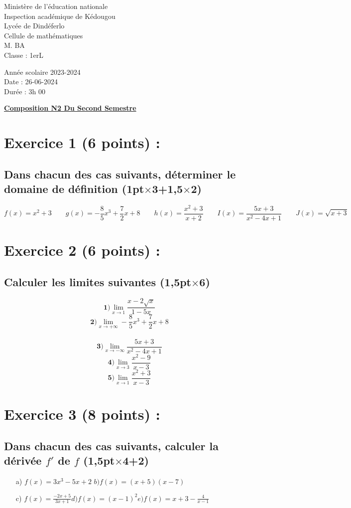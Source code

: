 \documentclass{article}
\begin{document}
\begin{minipage}{0.5\textwidth}
	Ministère de l'éducation nationale  \\
	Inspection académique de Kédougou   \\
	Lycée de Dindéferlo            \\
	Cellule de mathématiques            \\
	M. BA                          \\
	Classe : 1erL  \\
\end{minipage}
\begin{minipage}{0.5\textwidth}
	Année scolaire 2023-2024 \\
	Date : 26-06-2024 \\
	Durée : 3h 00 \\
\end{minipage}

\begin{center}
	\textbf{{\underline{Composition N2 Du Second Semestre}}}
\end{center}
\section*{Exercice 1 (6 points) :}
\subsection*{Dans chacun des cas suivants, déterminer le domaine de définition \textbf{(1pt$\times$3+1,5$\times$2)}}
\[ f(x)=x^2+3 \quad\quad g(x)=-\frac{8}{5}x^{3}+\frac{7}{2}x+8\quad\quad
h(x)=\frac{x^2+3}{x+2}\quad\quad I(x)=\frac{5x+3}{x^{2}-4x+1}\quad\quad J(x)=\sqrt{x+3}\]
\section*{Exercice 2 (6 points) :}
\subsection*{Calculer les limites suivantes \textbf{(1,5pt$\times$6)}}
\[\textbf{1)}\lim_{x \to 1}\frac{x-2\sqrt{x}}{1-5x}\]
\[\textbf{2)}\lim_{x \to +\infty}-\frac{8}{5}x^{3}+\frac{7}{2}x+8\]\
\[\textbf{3)}\lim_{x \to -\infty}\frac{5x+3}{x^{2}-4x+1}\]
\[\textbf{4)}\lim_{x \to 3}\frac{x^{2}-9}{x-3}\]
\[\textbf{5)}\lim_{x \to 1}\frac{x^{2}+3}{x-3}\]
\section*{Exercice 3 (8 points) :}
\subsection*{ Dans chacun des cas suivants, calculer la dérivée $f'$ de $f$ \textbf{(1,5pt$\times$4+2)}}
\begin{itemize}
\item[a)]$f(x)=3x^{3}-5x+2$\quad\quad 
$b)f(x)=(x+5)(x-7)$
\item[c)]$f(x)=\frac{-2x+5}{3x+1}$\quad\quad $d)f(x)=(x-1)^{2}$\quad\quad $e)f(x)=x+3-\frac{4}{x-1}$
\end{itemize}
\end{document}
